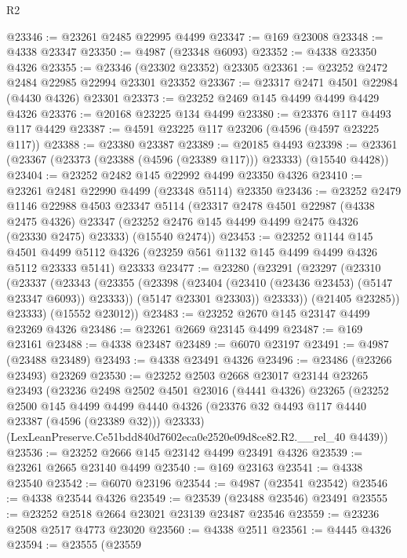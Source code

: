 \begin{lexlean}{R2}
\begin{coremodule}
@23346 := @23261 @2485 @22995 @4499
@23347 := @169 @23008
@23348 := @4338 @23347
@23350 := @4987 (@23348 @6093)
@23352 := @4338 @23350 @4326
@23355 := @23346 (@23302 @23352) @23305
@23361 := @23252 @2472 @2484 @22985 @22994 @23301 @23352
@23367 := @23317 @2471 @4501 @22984 (@4430 @4326) @23301
@23373 := @23252 @2469 @145 @4499 @4499 @4429 @4326
@23376 := @20168 @23225 @134 @4499
@23380 := @23376 @117 @4493 @117 @4429
@23387 := @4591 @23225 @117 @23206 (@4596 (@4597 @23225 @117))
@23388 := @23380 @23387
@23389 := @20185 @4493
@23398 := @23361 (@23367 (@23373 (@23388 (@4596 (@23389 @117))) @23333) (@15540 @4428))
@23404 := @23252 @2482 @145 @22992 @4499 @23350 @4326
@23410 := @23261 @2481 @22990 @4499 (@23348 @5114) @23350
@23436 := @23252
    @2479
    @1146
    @22988
    @4503
    @23347
    @5114
    (@23317
      @2478
      @4501
      @22987
      (@4338 @2475 @4326)
      @23347
      (@23252 @2476 @145 @4499 @4499 @2475 @4326 (@23330 @2475) @23333)
      (@15540 @2474))
@23453 := @23252
    @1144
    @145
    @4501
    @4499
    @5112
    @4326
    (@23259 @561 @1132 @145 @4499 @4499 @4326 @5112 @23333 @5141)
    @23333
@23477 := @23280
    (@23291
      (@23297
        (@23310
          (@23337
            (@23343
              (@23355
                (@23398 (@23404 (@23410 (@23436 @23453) (@5147 @23347 @6093)) @23333))
                (@5147 @23301 @23303))
              @23333))
          (@21405 @23285))
        @23333)
      (@15552 @23012))
@23483 := @23252 @2670 @145 @23147 @4499 @23269 @4326
@23486 := @23261 @2669 @23145 @4499
@23487 := @169 @23161
@23488 := @4338 @23487
@23489 := @6070 @23197
@23491 := @4987 (@23488 @23489)
@23493 := @4338 @23491 @4326
@23496 := @23486 (@23266 @23493) @23269
@23530 := @23252
    @2503
    @2668
    @23017
    @23144
    @23265
    @23493
    (@23236
      @2498
      @2502
      @4501
      @23016
      (@4441 @4326)
      @23265
      (@23252
        @2500
        @145
        @4499
        @4499
        @4440
        @4326
        (@23376 @32 @4493 @117 @4440 @23387 (@4596 (@23389 @32)))
        @23333)
      (LexLeanPreserve.Ce51bdd840d7602eca0e2520e09d8ce82.R2.__rel_40 @4439))
@23536 := @23252 @2666 @145 @23142 @4499 @23491 @4326
@23539 := @23261 @2665 @23140 @4499
@23540 := @169 @23163
@23541 := @4338 @23540
@23542 := @6070 @23196
@23544 := @4987 (@23541 @23542)
@23546 := @4338 @23544 @4326
@23549 := @23539 (@23488 @23546) @23491
@23555 := @23252 @2518 @2664 @23021 @23139 @23487 @23546
@23559 := @23236 @2508 @2517 @4773 @23020
@23560 := @4338 @2511
@23561 := @4445 @4326
@23594 := @23555
    (@23559

\end{coremodule}
\end{lexlean}

